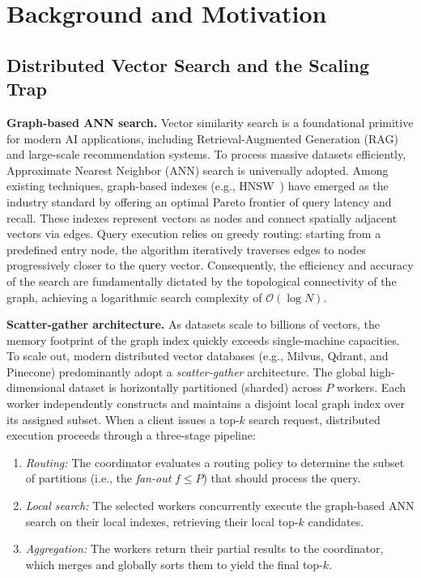 \section{Background and Motivation}
\label{sec:motivation}

\subsection{Distributed Vector Search and the Scaling Trap}
\label{subsec:background}

\noindent\textbf{Graph-based ANN search.} Vector similarity search is a foundational primitive for modern AI applications, including Retrieval-Augmented Generation (RAG) and large-scale recommendation systems. To process massive datasets efficiently, Approximate Nearest Neighbor (ANN) search is universally adopted. Among existing techniques, graph-based indexes (e.g., HNSW~\cite{malkov2018efficient}) have emerged as the industry standard by offering an optimal Pareto frontier of query latency and recall. These indexes represent vectors as nodes and connect spatially adjacent vectors via edges. Query execution relies on greedy routing: starting from a predefined entry node, the algorithm iteratively traverses edges to nodes progressively closer to the query vector. Consequently, the efficiency and accuracy of the search are fundamentally dictated by the topological connectivity of the graph, achieving a logarithmic search complexity of $\mathcal{O}(\log N)$.

\noindent\textbf{Scatter-gather architecture.} As datasets scale to billions of vectors, the memory footprint of the graph index quickly exceeds single-machine capacities. To scale out, modern distributed vector databases (e.g., Milvus, Qdrant, and Pinecone) predominantly adopt a \textit{scatter-gather} architecture. The global high-dimensional dataset is horizontally partitioned (sharded) across $P$ workers. Each worker independently constructs and maintains a disjoint local graph index over its assigned subset. When a client issues a top-$k$ search request, distributed execution proceeds through a three-stage pipeline:
\begin{enumerate}[leftmargin=*, topsep=2pt, itemsep=0pt, parsep=0pt]
    \item \textit{Routing:} The coordinator evaluates a routing policy to determine the subset of partitions (i.e., the \textit{fan-out} $f \le P$) that should process the query.
    \item \textit{Local search:} The selected workers concurrently execute the graph-based ANN search on their local indexes, retrieving their local top-$k$ candidates.
    \item \textit{Aggregation:} The workers return their partial results to the coordinator, which merges and globally sorts them to yield the final top-$k$.
\end{enumerate}

